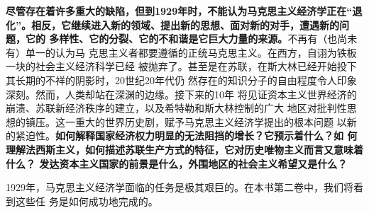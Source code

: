 \textbf{尽管存在着许多重大的缺陷，但到1929年时，不能认为马克思主义经济学正在“退
  化”。相反，它继续进入新的领域、提出新的思想、面对新的对手，遭遇新的问题，它的
  多样性、它的分裂、它的不和谐是它巨大力量的来源。}不再有（也尚未有）单一的认为马
克思主义者都要遵循的正统马克思主义。在西方，自诩为铁板一块的社会主义经济科学已经
被抛弃了。甚至是在苏联，在斯大林已经开始投下其长期的不祥的阴影时，20世纪20年代仍
然存在的知识分子的自由程度令人印象深刻。然而，人类却站在深渊的边缘。接下来的10年
将见证资本主义世界经济的崩溃、苏联新经济秩序的建立，以及希特勒和斯大林控制的广大
地区对批判性思想的镇压。这一重大的世界历史剧，赋予马克思主义经济学提出的根本问题
以新的紧迫性。\textbf{如何解释国家经济权力明显的无法阻挡的增长？它预示着什么？如
  何理解法西斯主义，如何描述苏联生产方式的特征，它对历史唯物主义而言又意味着什么？
  发达资本主义国家的前景是什么，外围地区的社会主义希望又是什么？}

1929年，马克思主义经济学面临的任务是极其艰巨的。在本书第二卷中，我们将看到这些任
务是如何成功地完成的。



